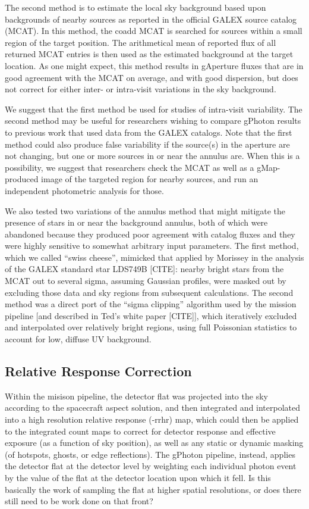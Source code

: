 \documentclass[5p]{elsarticle}
\begin{document}
The second method is to estimate the local sky background based upon backgrounds of nearby sources as reported in the official GALEX source catalog (MCAT). In this method, the coadd MCAT is searched for sources within a small region of the target position. The arithmetical mean of reported flux of all returned MCAT entries is then used as the estimated background at the target location. As one might expect, this method results in gAperture fluxes that are in good agreement with the MCAT on average, and with good dispersion, but does not correct for either inter- or intra-visit variations in the sky background.

We suggest that the first method be used for studies of intra-visit variability. The second method may be useful for researchers wishing to compare gPhoton results to previous work that used data from the GALEX catalogs. Note that the first method could also produce false variability if the source(s) in the aperture are not changing, but one or more sources in or near the annulus are.  When this is a possibility, we suggest that researchers check the MCAT as well as a gMap-produced image of the targeted region for nearby sources, and run an independent photometric analysis for those.

We also tested two variations of the annulus method that might mitigate the presence of stars in or near the background annulus, both of which were abandoned because they produced poor agreement with catalog fluxes and they were highly sensitive to somewhat arbitrary input parameters. The first method, which we called ``swiss cheese'', mimicked that applied by {\color{red}Morissey in the analysis of the GALEX standard star LDS749B [CITE]}: nearby bright stars from the MCAT out to several sigma, assuming Gaussian profiles, were masked out by excluding those data and sky regions from subsequent calculations. The second method was a direct port of the ``sigma clipping'' algorithm used by the mission pipeline {\color{red}[and described in Ted's white paper [CITE]]}, which iteratively excluded and interpolated over relatively bright regions, using full Poissonian statistics to account for low, diffuse UV background.

\subsection{Relative Response Correction}
Within the misison pipeline, the detector flat was projected into the sky according to the spacecraft aspect solution, and then integrated and interpolated into a high resolution relative response (-rrhr) map, which could then be applied to the integrated count maps to correct for detector response and effective exposure (as a function of sky position), as well as any static or dynamic masking (of hotspots, ghosts, or edge reflections). The gPhoton pipeline, instead, applies the detector flat at the detector level by weighting each individual photon event by the value of the flat at the detector location upon which it fell.  {\color{red}Is this basically the work of sampling the flat at higher spatial resolutions, or does there still need to be work done on that front?}
\end{document}
